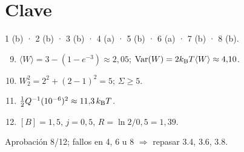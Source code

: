 \documentclass[11pt,a4paper]{article}
\begin{document}
\section*{Clave}
1 (b) · 2 (b) · 3 (b) · 4 (a) · 5 (b) · 6 (a) · 7 (b) · 8 (b).
\begin{enumerate}\setcounter{enumi}{8}
\item $\langle W\rangle=3-(1-e^{-3})\approx2{,}05$; $\mathrm{Var}(W)=2k_{\mathrm B} T\langle W\rangle\approx4{,}10$.
\item $W_2^2=2^2+(2-1)^2=5$; $\Sigma\ge5$.
\item $\tfrac12Q^{-1}(10^{-6})^2\approx11{,}3\,k_{\mathrm B} T$.
\item $[B]=1{,}5$, $j=0{,}5$, $R=\ln2/0{,}5=1{,}39$.
\end{enumerate}
Aprobación 8/12; fallos en 4, 6 u 8 $\Rightarrow$ repasar 3.4, 3.6, 3.8.
\end{document}
